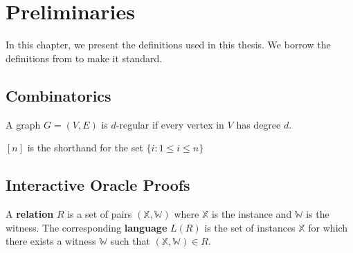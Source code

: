 \chapter{Preliminaries}

In this chapter, we present the definitions used in this thesis. We borrow the definitions from \cite{brakedown} \cite{cryptoeprint:2020/1426} \cite{BCL22} \cite{10.1145/2554797.2554815} \cite{orion} \cite{lwe} \cite{DBLP:conf/tcc/Ben-SassonCS16} \cite{DBLP:journals/iacr/BonehDFG20a} to make it standard.

\section{Combinatorics}

\begin{definition}

A graph $G = (V, E)$ is $d$-regular if every vertex in $V$ has degree $d$.

\end{definition}

\begin{definition}[Set]

$[n]$ is the shorthand for the set $\{i: 1 \le i \le n\}$

\end{definition}

\section{Interactive Oracle Proofs}

\begin{definition}[Relation]

A \textbf{relation} $R$ is a set of pairs $(\mathbb{X}, \mathbb{W})$ where $\mathbb{X}$ is the instance and $\mathbb{W}$ is the witness. The corresponding \textbf{language} $L(R)$ is the set of instances $\mathbb{X}$ for which there exists a witness $\mathbb{W}$ such that $(\mathbb{X}, \mathbb{W}) \in R$.

\end{definition}

